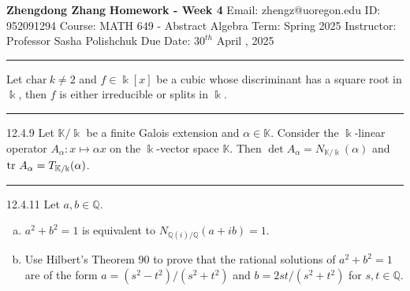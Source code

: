 \documentclass[a4paper, 12pt]{article}
\begin{document}
\noindent

\large\textbf{Zhengdong Zhang} \hfill \textbf{Homework - Week 4}
Email: zhengz@uoregon.edu \hfill ID: 952091294
\normalsize Course: MATH 649 - Abstract Algebra \hfill Term: Spring 2025
Instructor: Professor Sasha Polishchuk \hfill Due Date: $30^{th}$ April , 2025 
\noindent\rule{7in}{2.8pt}

\begin{problem}{12.16}
Let \(\text{char}\  k\neq 2\) and \(f\in \Bbbk[x]\) be a cubic whose discriminant has a square root in \(\Bbbk\), then \(f\) is either irreducible or splits in \(\Bbbk\).
\end{problem}
\begin{solution}

\end{solution}

\noindent\rule{7in}{2.8pt}
\begin{problem}{12.4.9}
Let \(\mathbb{K}/\Bbbk\) be a finite Galois extension and \(\alpha\in \mathbb{K}\). Consider the \(\Bbbk\)-linear operator \(A_\alpha:x\mapsto \alpha x\) on the \(\Bbbk\)-vector space \(\mathbb{K}\). Then \(\det A_\alpha=N_{\mathbb{K}/\Bbbk}(\alpha)\) and 
\(\text{tr}\  A_\alpha=T_{\mathbb{K}/\Bbbk}(\alpha)\).
\end{problem}
\begin{solution}

\end{solution}

\noindent\rule{7in}{2.8pt}
\begin{problem}{12.4.11}
Let \(a,b\in \mathbb{Q}\). 
\begin{enumerate}[(a)]
\item \(a^2+b^2=1\) is equivalent to \(N_{\mathbb{Q}(i)/\mathbb{Q}}(a+ib)=1\).
\item Use Hilbert's Theorem 90 to prove that the rational solutions of \(a^2+b^2=1\) are of the form \(a=(s^2-t^2)/(s^2+t^2)\) and \(b=2st/(s^2+t^2)\) for \(s,t\in \mathbb{Q}\).
\end{enumerate}
\end{problem}
\begin{solution}

\end{solution}
\end{document}
